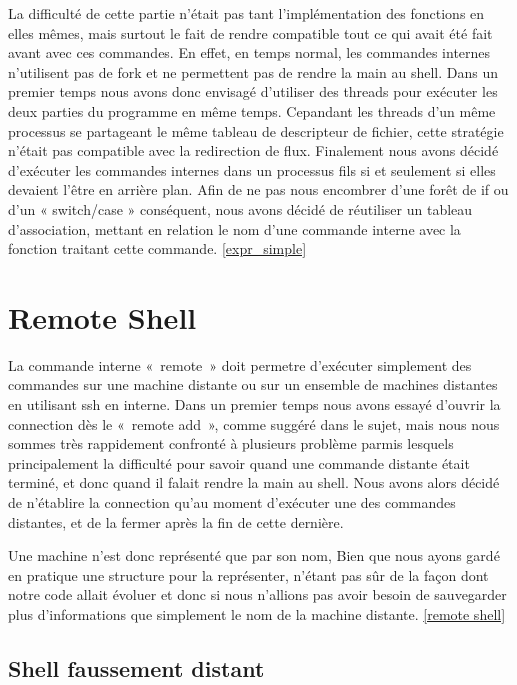 \documentclass[12pt]{article}
\begin{document}
 La difficulté de cette partie n'était pas tant l'implémentation des fonctions en elles mêmes,
 mais surtout le fait de rendre compatible tout ce qui avait été fait avant avec ces commandes.
 En effet, en temps normal, les commandes internes n'utilisent pas de fork et ne permettent pas
 de rendre la main au shell. Dans un premier temps nous avons donc envisagé d'utiliser des threads
 pour exécuter les deux parties du programme en même temps. Cepandant les threads d'un même processus
 se partageant le même tableau de descripteur de fichier, cette stratégie n'était pas compatible
 avec la redirection de flux. Finalement nous avons décidé d'exécuter les commandes internes dans
 un processus fils si et seulement si elles devaient l'être en arrière plan.
 Afin de ne pas nous encombrer d'une forêt de if ou d'un « switch/case » conséquent, nous avons
 décidé de réutiliser un tableau d'association, mettant en relation le nom d'une commande interne
 avec la fonction traitant cette commande.  \ref{expr_simple}
 

\newpage
\section{Remote Shell}

La commande interne «~remote~» doit permetre d'exécuter simplement des commandes sur une machine
distante ou sur un ensemble de machines distantes en utilisant ssh en interne. Dans un premier 
temps nous avons essayé d'ouvrir la connection dès le «~remote add~», comme suggéré dans le 
sujet, mais nous nous sommes très rappidement confronté à plusieurs problème parmis lesquels
principalement la difficulté pour savoir quand une commande distante était terminé, et donc quand
il falait rendre la main au shell. Nous avons alors décidé de n'établire la connection qu'au moment
d'exécuter une des commandes distantes, et de la fermer après la fin de cette dernière.\newline

Une machine n'est donc représenté que par son nom, Bien que nous ayons gardé en pratique une
structure pour la représenter, n'étant pas sûr de la façon dont notre code allait évoluer et
donc si nous n'allions pas avoir besoin de sauvegarder plus d'informations que simplement le
nom de la machine distante. \ref{remote shell}


\subsection{Shell faussement distant}
\end{document}
